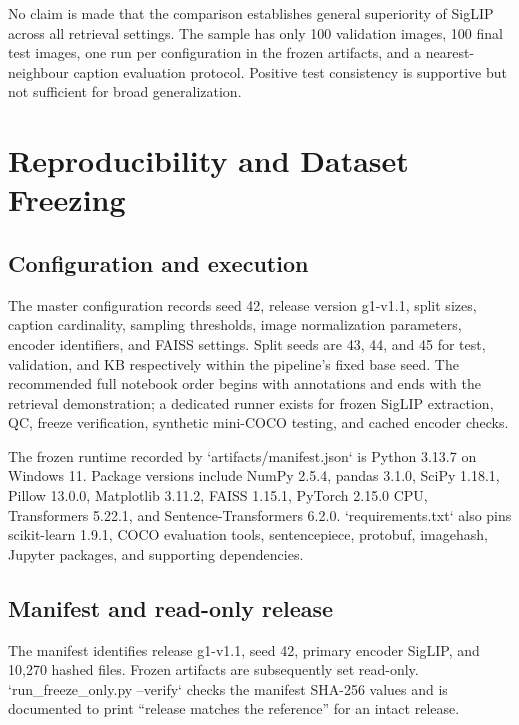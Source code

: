 \documentclass{article}
\begin{document}
No claim is made that the comparison establishes general superiority of
SigLIP across all retrieval settings. The sample has only 100 validation
images, 100 final test images, one run per configuration in the frozen
artifacts, and a nearest-neighbour caption evaluation protocol. Positive
test consistency is supportive but not sufficient for broad
generalization.

\section{Reproducibility and Dataset
Freezing}\label{reproducibility-and-dataset-freezing}

\subsection{Configuration and
execution}\label{configuration-and-execution}

The master configuration records seed 42, release version g1-v1.1, split
sizes, caption cardinality, sampling thresholds, image normalization
parameters, encoder identifiers, and FAISS settings. Split seeds are 43,
44, and 45 for test, validation, and KB respectively within the
pipeline's fixed base seed. The recommended full notebook order begins
with annotations and ends with the retrieval demonstration; a dedicated
runner exists for frozen SigLIP extraction, QC, freeze verification,
synthetic mini-COCO testing, and cached encoder checks.

The frozen runtime recorded by `artifacts/manifest.json` is Python
3.13.7 on Windows 11. Package versions include NumPy 2.5.4, pandas
3.1.0, SciPy 1.18.1, Pillow 13.0.0, Matplotlib 3.11.2, FAISS 1.15.1,
PyTorch 2.15.0 CPU, Transformers 5.22.1, and Sentence-Transformers
6.2.0. `requirements.txt` also pins scikit-learn 1.9.1, COCO evaluation
tools, sentencepiece, protobuf, imagehash, Jupyter packages, and
supporting dependencies.

\subsection{Manifest and read-only
release}\label{manifest-and-read-only-release}

The manifest identifies release g1-v1.1, seed 42, primary encoder
SigLIP, and 10,270 hashed files. Frozen artifacts are subsequently set
read-only. `run\_freeze\_only.py --verify` checks the manifest SHA-256
values and is documented to print ``release matches the reference''
for an intact release.
\end{document}
